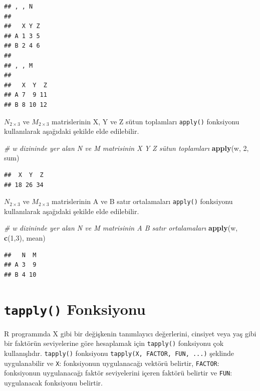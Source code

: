 \documentclass[
]{book}
\newenvironment{Shaded}{\begin{snugshade}}{\end{snugshade}}
\newcommand{\CommentTok}[1]{\textcolor[rgb]{0.56,0.35,0.01}{\textit{#1}}}
\newcommand{\DecValTok}[1]{\textcolor[rgb]{0.00,0.00,0.81}{#1}}
\newcommand{\FunctionTok}[1]{\textcolor[rgb]{0.13,0.29,0.53}{\textbf{#1}}}
\newcommand{\NormalTok}[1]{#1}
\begin{document}
\begin{verbatim}
## , , N
## 
##   X Y Z
## A 1 3 5
## B 2 4 6
## 
## , , M
## 
##   X  Y  Z
## A 7  9 11
## B 8 10 12
\end{verbatim}

\(N_{2×3}\) ve \(M_{2×3}\) matrislerinin X, Y ve Z sütun toplamları \texttt{apply()} fonksiyonu kullanılarak aşağıdaki şekilde elde edilebilir.

\begin{Shaded}
\begin{Highlighting}[]
\CommentTok{\# w dizininde yer alan N ve M matrisinin X Y Z sütun toplamları }
\FunctionTok{apply}\NormalTok{(w, }\DecValTok{2}\NormalTok{, sum)}
\end{Highlighting}
\end{Shaded}

\begin{verbatim}
##  X  Y  Z 
## 18 26 34
\end{verbatim}

\(N_{2×3}\) ve \(M_{2×3}\) matrislerinin A ve B satır ortalamaları \texttt{apply()} fonksiyonu kullanılarak aşağıdaki şekilde elde edilebilir.

\begin{Shaded}
\begin{Highlighting}[]
\CommentTok{\# w dizininde yer alan N ve M matrisinin A B satır ortalamaları }
\FunctionTok{apply}\NormalTok{(w, }\FunctionTok{c}\NormalTok{(}\DecValTok{1}\NormalTok{,}\DecValTok{3}\NormalTok{), mean) }
\end{Highlighting}
\end{Shaded}

\begin{verbatim}
##   N  M
## A 3  9
## B 4 10
\end{verbatim}

\section{\texorpdfstring{\texttt{tapply()} Fonksiyonu}{tapply() Fonksiyonu}}\label{tapply-fonksiyonu}

R programında X gibi bir değişkenin tanımlayıcı değerlerini, cinsiyet veya yaş gibi bir faktörün seviyelerine göre hesaplamak için \texttt{tapply()} fonksiyonu çok kullanışlıdır. \texttt{tapply()} fonksiyonu \texttt{tapply(X,\ FACTOR,\ FUN,\ ...)} şeklinde uygulanabilir ve \texttt{X}: fonksiyonun uygulanacağı vektörü belirtir, \texttt{FACTOR}: fonksiyonun uygulanacağı faktör seviyelerini içeren faktörü belirtir ve \texttt{FUN}: uygulanacak fonksiyonu belirtir.
\end{document}
